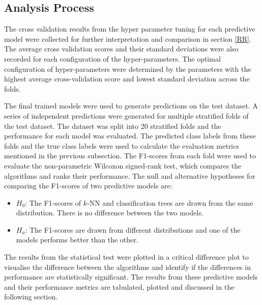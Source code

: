 \documentclass[conference]{IEEEtran}
\begin{document}
	\subsection{Analysis Process}
	The cross validation results from the hyper parameter tuning for each predictive model were collected for further interpretation and comparison in section \ref{RR}. The average cross validation scores and their standard deviations were also recorded for each configuration of the hyper-parameters. The optimal configuration of hyper-parameters were determined by the parameters with the highest average cross-validation score and lowest standard deviation across the folds.
	
	The final trained models were used to generate predictions on the test dataset. A series of independent predictions were generated for multiple stratified folds of the test dataset. The dataset was split into 20 stratified folds and the performance for each model was evaluated. The predicted class labels from these folds and the true class labels were used to calculate the evaluation metrics mentioned in the previous subsection. The F1-scores from each fold were used to evaluate the non-parametric Wilcoxon signed-rank test, which compares the algorithms and ranks their performance. The null and alternative hypotheses for comparing the F1-scores of two predictive models are:
	\begin{itemize}
		\item $H_0$: The F1-scores of $k$-NN and classification trees are drawn from the same distribution. There is no difference between the two models.
		\item $H_a$: The F1-scores are drawn from different distributions and one of the models performs better than the other.
	\end{itemize}
	The results from the statistical test were plotted in a critical difference plot to visualise the difference between the algorithms and identify if the differences in performance are statistically significant. The results from these predictive models and their performance metrics are tabulated, plotted and discussed in the following section.
	
\end{document}

